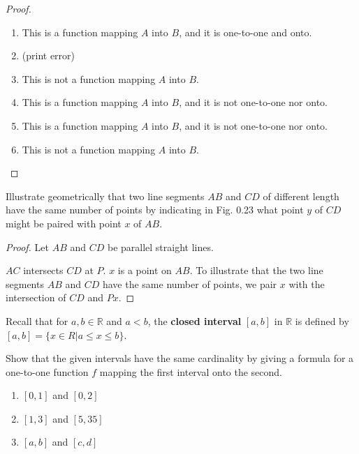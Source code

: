 \begin{proof}
    \begin{enumerate}[label={\textbf{\alph*.}},itemsep=0pt]
        \item This is a function mapping $A$ into $B$, and it is one-to-one and onto.
        \item (print error)
        \item This is not a function mapping $A$ into $B$.
        \item This is a function mapping $A$ into $B$, and it is not one-to-one nor onto.
        \item This is a function mapping $A$ into $B$, and it is not one-to-one nor onto.
        \item This is not a function mapping $A$ into $B$.
    \end{enumerate}
\end{proof}

\newpage
\begin{exercise}
    Illustrate geometrically that two line segments $AB$ and $CD$ of different length have the same number of points by indicating in Fig. 0.23 what point $y$ of $CD$ might be paired with point $x$ of $AB$.
\end{exercise}

\begin{proof}
    Let $AB$ and $CD$ be parallel straight lines.

    $AC$ intersects $CD$ at $P$. $x$ is a point on $AB$. To illustrate that the two line segments $AB$ and $CD$ have the same number of points, we pair $x$ with the intersection of $CD$ and $Px$.
\end{proof}

\newpage
\begin{exercise}
    Recall that for $a, b \in\mathbb{R}$ and $a < b$, the \textbf{closed interval} $[a, b]$ in $\mathbb{R}$ is defined by $[a, b] = \{ x \in R \vert a \le x \le b \}$.

    Show that the given intervals have the same cardinality by giving a formula for a one-to-one function $f$ mapping the first interval onto the second.
    \begin{enumerate}[label={\textbf{\alph*.}},itemsep=0pt]
        \item $[0, 1]$ and $[0, 2]$
        \item $[1, 3]$ and $[5, 35]$
        \item $[a, b]$ and $[c, d]$
    \end{enumerate}
\end{exercise}

